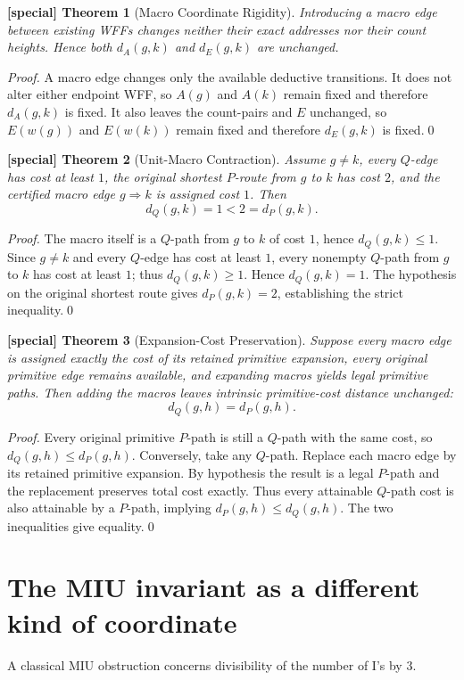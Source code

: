 \documentclass[11pt]{article}
\newtheorem{spthm}{[special] Theorem}
\newcommand{\dA}{d_A}
\newcommand{\dE}{d_E}
\begin{document}
\begin{spthm}[Macro Coordinate Rigidity]
Introducing a macro edge between existing WFFs changes neither their exact addresses nor their count heights. Hence both $\dA(g,k)$ and $\dE(g,k)$ are unchanged.
\end{spthm}
\textit{Proof.} A macro edge changes only the available deductive transitions. It does not alter either endpoint WFF, so $A(g)$ and $A(k)$ remain fixed and therefore $d_A(g,k)$ is fixed. It also leaves the count-pairs and $E$ unchanged, so $E(w(g))$ and $E(w(k))$ remain fixed and therefore $d_E(g,k)$ is fixed.\qed

\begin{spthm}[Unit-Macro Contraction]
Assume $g\ne k$, every $Q$-edge has cost at least $1$, the original shortest $P$-route from $g$ to $k$ has cost $2$, and the certified macro edge $g\Rightarrow k$ is assigned cost $1$. Then
\[d_Q(g,k)=1<2=d_P(g,k).\]
\end{spthm}
\textit{Proof.} The macro itself is a $Q$-path from $g$ to $k$ of cost $1$, hence $d_Q(g,k)\le1$. Since $g\ne k$ and every $Q$-edge has cost at least $1$, every nonempty $Q$-path from $g$ to $k$ has cost at least $1$; thus $d_Q(g,k)\ge1$. Hence $d_Q(g,k)=1$. The hypothesis on the original shortest route gives $d_P(g,k)=2$, establishing the strict inequality.\qed


\begin{spthm}[Expansion-Cost Preservation]
Suppose every macro edge is assigned exactly the cost of its retained primitive expansion, every original primitive edge remains available, and expanding macros yields legal primitive paths. Then adding the macros leaves intrinsic primitive-cost distance unchanged:
\[d_Q(g,h)=d_P(g,h).\]
\end{spthm}
\textit{Proof.} Every original primitive $P$-path is still a $Q$-path with the same cost, so $d_Q(g,h)\le d_P(g,h)$. Conversely, take any $Q$-path. Replace each macro edge by its retained primitive expansion. By hypothesis the result is a legal $P$-path and the replacement preserves total cost exactly. Thus every attainable $Q$-path cost is also attainable by a $P$-path, implying $d_P(g,h)\le d_Q(g,h)$. The two inequalities give equality.\qed


\section{The MIU invariant as a different kind of coordinate}
A classical MIU obstruction concerns divisibility of the number of I's by $3$.
\end{document}
